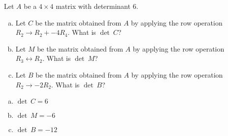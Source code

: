 
\begin{exerciseStatement}


Let \(A\) be a \(4 \times 4\) matrix with determinant \( 6 \).


\begin{enumerate}[(a)]
\item Let \(C\) be the matrix obtained from \(A\) by applying the row operation \( R_2 \to R_2 + -4R_4 \). What is \(\operatorname{det}\ C\)?
\item Let \(M\) be the matrix obtained from \(A\) by applying the row operation \( R_3 \leftrightarrow R_2 \). What is \(\operatorname{det}\ M\)?
\item Let \(B\) be the matrix obtained from \(A\) by applying the row operation \( R_2 \to -2R_2 \). What is \(\operatorname{det}\ B\)?
\end{enumerate}
    
\end{exerciseStatement}
    
\begin{exerciseAnswer} 

\begin{enumerate}[(a)]
\item \(\operatorname{det}\ C= 6 \)
\item \(\operatorname{det}\ M= -6 \)
\item \(\operatorname{det}\ B= -12 \)
\end{enumerate}
    
\end{exerciseAnswer}
    
